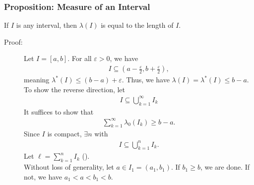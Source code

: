 \documentclass[10pt]{extarticle}
\begin{document}
  \subsubsection{Proposition: Measure of an Interval}%
  If $I$ is any interval, then $\lambda(I)$ is equal to the length of $I$.
  \begin{description}
    \item[Proof:] Let $I = [a,b]$. For all $\varepsilon > 0$, we have
      \begin{align*}
        I\subseteq \left(a-\frac{\varepsilon}{2},b+\frac{\varepsilon}{2}\right),
      \end{align*}
      meaning $\lambda^{\ast}(I) \leq (b-a) + \varepsilon$. Thus, we have $\lambda(I) = \lambda^{\ast}(I) \leq b-a$. To show the reverse direction, let
      \begin{align*}
        I\subseteq \bigcup_{k=1}^{\infty}I_k \tag*{$I_k$ open.}
      \end{align*}
      It suffices to show that
      \begin{align*}
        \sum_{k=1}^{\infty}\lambda_0(I_k) \geq b-a.
      \end{align*}
      Since $I$ is compact, $\exists n$ with
      \begin{align*}
        I\subseteq \bigcup_{k=1}^{n}I_k.
      \end{align*}
      Let $\ell = \sum_{k=1}^{n}I_k$ (\textasteriskcentered).\\

      Without loss of generality, let $a\in I_1 = (a_1,b_1)$. If $b_1 \geq b$, we are done. If not, we have $a_1 < a < b_1 < b$.\\


\end{description}
\end{document}
